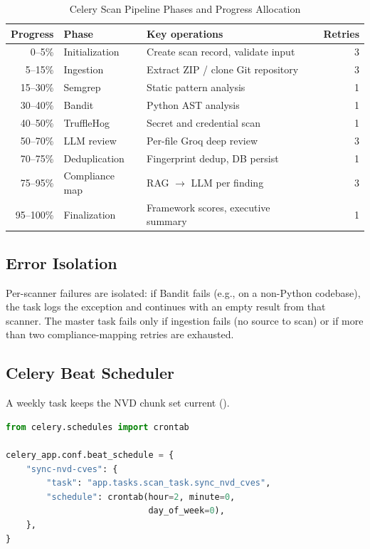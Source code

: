 \documentclass[conference]{IEEEtran}
\newcommand{\tsz}{\footnotesize}
\begin{document}
\begin{table}[!t]
\caption{Celery Scan Pipeline Phases and Progress Allocation}
\label{tab:celery}
\centering\tsz
\begin{tabularx}{\columnwidth}{@{}rlXr@{}}
\toprule
\textbf{Progress} & \textbf{Phase} & \textbf{Key operations} & \textbf{Retries}\\
\midrule
0--5\%    & Initialization & Create scan record, validate input & 3\\
5--15\%   & Ingestion      & Extract ZIP / clone Git repository & 3\\
15--30\%  & Semgrep        & Static pattern analysis & 1\\
30--40\%  & Bandit         & Python AST analysis & 1\\
40--50\%  & TruffleHog     & Secret and credential scan & 1\\
50--70\%  & LLM review     & Per-file Groq deep review & 3\\
70--75\%  & Deduplication  & Fingerprint dedup, DB persist & 1\\
75--95\%  & Compliance map & RAG $\to$ LLM per finding & 3\\
95--100\% & Finalization   & Framework scores, executive summary & 1\\
\bottomrule
\end{tabularx}
\end{table}

\subsection{Error Isolation}
Per-scanner failures are isolated: if Bandit fails (e.g., on a non-Python
codebase), the task logs the exception and continues with an empty result from
that scanner. The master task fails only if ingestion fails (no source to scan)
or if more than two compliance-mapping retries are exhausted.

\subsection{Celery Beat Scheduler}
A weekly task keeps the NVD chunk set current ().

\begin{lstlisting}[language=Python, label={lst:beat},
  caption={Celery Beat schedule for weekly NVD CVE synchronization.}]
from celery.schedules import crontab

celery_app.conf.beat_schedule = {
    "sync-nvd-cves": {
        "task": "app.tasks.scan_task.sync_nvd_cves",
        "schedule": crontab(hour=2, minute=0,
                            day_of_week=0),
    },
}
\end{lstlisting}
\end{document}
